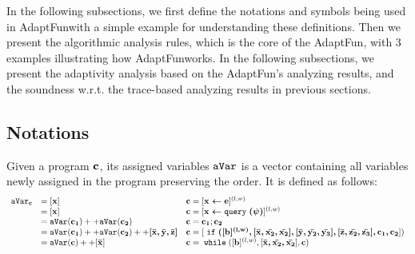 \documentclass[a4paper,11pt]{article}
\newcommand{\THESYSTEM}{\textsf{AdaptFun}}
\begin{document}
In the following subsections, 
we first define the notations and symbols being used in \THESYSTEM  with a simple example for understanding these definitions. 
Then we present the algorithmic analysis rules, which is the core of the \THESYSTEM, with
3 examples illustrating how \THESYSTEM  works.
In the following subsections, we present the adaptivity analysis based on the \THESYSTEM's analyzing results, and the soundness w.r.t. the trace-based analyzing results in previous sections.

\subsection{Notations}
%
\label{subsec:alg_notation}
%
\begin{defn}
Given a program ${\boldsymbol{\mathbf{c}}}$, its assigned variables $\mathtt{aVar}$ is a vector containing all variables newly assigned in the program preserving the order. 
It is defined as follows:
$$
\begin{array}{lll}
   \mathtt{aVar}_{{\boldsymbol{\mathbf{c}}}} 	
   		& = [{\boldsymbol{\mathbf{x}}}] 									
   		& {\boldsymbol{\mathbf{c}}} 	= 
   			[{\boldsymbol{\mathbf{\mathrel{ x \leftarrow e }}}}]^{(l, w)} \\
     	& = [{\boldsymbol{\mathbf{x}}}] 									
     	& {\boldsymbol{\mathbf{c}}} 	= 
     		[{\boldsymbol{\mathbf{\mathrel{ x \leftarrow {\tt query} }(\psi)}}}]^{(l, w)} \\
     	& = \mathtt{aVar}({\boldsymbol{\mathbf{c_1}}}) ++ \mathtt{aVar} ({\boldsymbol{\mathbf{c_2}}}) 	
     	& {\boldsymbol{\mathbf{c}}} 	= {\boldsymbol{\mathbf{c_1}}};{\boldsymbol{\mathbf{c_2}}}\\
     	& = \mathtt{aVar}({\boldsymbol{\mathbf{c_1}}}) ++ \mathtt{aVar} ({\boldsymbol{\mathbf{c_2}}}) 
     	++ {\boldsymbol{\mathbf{[\bar{x}, \bar{y}, \bar{z}]}}} 
     	& {\boldsymbol{\mathbf{c}}} 	= 
     	[{\boldsymbol{\mathbf{\;\mathtt{if}\; ([{\boldsymbol{\mathbf{b}}}]^{(l, w)} ,[\bar{x}, \bar{x_2}, \bar{x_2}], 
     	[\bar{y}, \bar{y_2}, \bar{y_3}], 
     	[\bar{z}, \bar{z_2}, \bar{z_3}], c_1, c_2}}}]) \\
     	& = \mathtt{aVar}({\boldsymbol{\mathbf{c}}}) ++ [{\boldsymbol{\mathbf{\bar{x}}}}]
     	& {\boldsymbol{\mathbf{c}}} 	= \;\mathtt{while}\; ([{\boldsymbol{\mathbf{b}}}]^{(l, w)}, [{\boldsymbol{\mathbf{\bar{x}, \bar{x_2}, \bar{x_2}}}}], {\boldsymbol{\mathbf{c}}})
\end{array}
$$
\end{defn}
%
%
\end{document}
